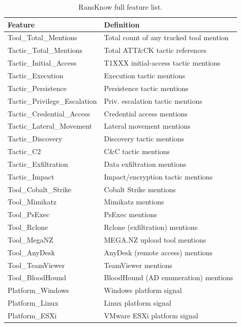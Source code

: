 \documentclass[journal]{IEEEtran}
\begin{document}
\begin{table}[t]
\centering
\caption{RansKnow full feature list.}
\label{tab:ransknow_full}
\setlength{\tabcolsep}{3pt}
\begin{tabular}{p{3.5cm}p{4.2cm}}
\toprule
\textbf{Feature} & \textbf{Definition} \\
\midrule
Tool\_Total\_Mentions     & Total count of any tracked tool mention \\
Tactic\_Total\_Mentions   & Total ATT\&CK tactic references \\
Tactic\_Initial\_Access   & T1XXX initial-access tactic mentions \\
Tactic\_Execution         & Execution tactic mentions \\
Tactic\_Persistence       & Persistence tactic mentions \\
Tactic\_Privilege\_Escalation & Priv. escalation tactic mentions \\
Tactic\_Credential\_Access & Credential access mentions \\
Tactic\_Lateral\_Movement & Lateral movement mentions \\
Tactic\_Discovery         & Discovery tactic mentions \\
Tactic\_C2                & C\&C tactic mentions \\
Tactic\_Exfiltration      & Data exfiltration mentions \\
Tactic\_Impact            & Impact/encryption tactic mentions \\
Tool\_Cobalt\_Strike      & Cobalt Strike mentions \\
Tool\_Mimikatz            & Mimikatz mentions \\
Tool\_PsExec              & PsExec mentions \\
Tool\_Rclone              & Rclone (exfiltration) mentions \\
Tool\_MegaNZ              & MEGA.NZ upload tool mentions \\
Tool\_AnyDesk             & AnyDesk (remote access) mentions \\
Tool\_TeamViewer          & TeamViewer mentions \\
Tool\_BloodHound          & BloodHound (AD enumeration) mentions \\
Platform\_Windows         & Windows platform signal \\
Platform\_Linux           & Linux platform signal \\
Platform\_ESXi            & VMware ESXi platform signal \\
\bottomrule
\end{tabular}
\end{table}
\end{document}

